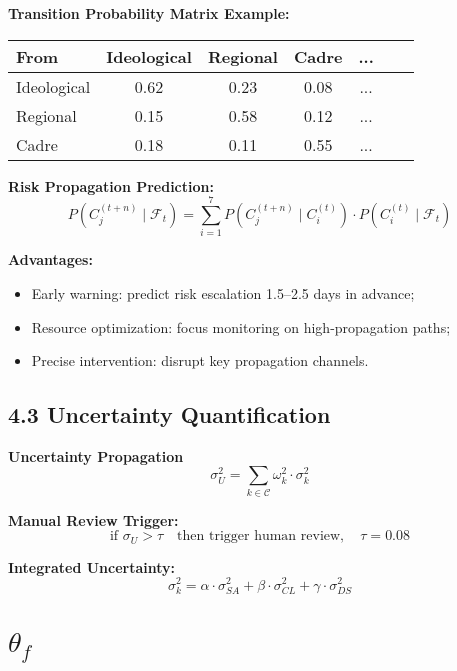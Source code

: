 \documentclass{article}
\numberwithin{equation}{section}
\begin{document}
\textbf{Transition Probability Matrix Example:}
\begin{table}[H]
\centering
\begin{tabular}{lcccccc}
\toprule
From & Ideological & Regional & Cadre & ... \\
\midrule
Ideological & 0.62 & 0.23 & 0.08 & ... \\
Regional & 0.15 & 0.58 & 0.12 & ... \\
Cadre & 0.18 & 0.11 & 0.55 & ... \\
\bottomrule
\end{tabular}
\end{table}

\textbf{Risk Propagation Prediction:}
$$
P(C_j^{(t+n)} \mid \mathcal{F}_t) = \sum_{i=1}^7 P(C_j^{(t+n)} \mid C_i^{(t)}) \cdot P(C_i^{(t)} \mid \mathcal{F}_t)
$$

\textbf{Advantages:}
\begin{itemize}
    \item Early warning: predict risk escalation 1.5–2.5 days in advance;
    \item Resource optimization: focus monitoring on high-propagation paths;
    \item Precise intervention: disrupt key propagation channels.
\end{itemize}

\subsection*{4.3 Uncertainty Quantification}

\textbf{Uncertainty Propagation}
$$
\sigma_U^2 = \sum_{k \in \mathcal{C}} \omega_k^2 \cdot \sigma_k^2
$$

\textbf{Manual Review Trigger:}
$$
\text{if } \sigma_U > \tau \quad \text{then trigger human review}, \quad \tau = 0.08
$$


\textbf{Integrated Uncertainty:}
$$
\sigma_k^2 = \alpha \cdot \sigma_{SA}^2 + \beta \cdot \sigma_{CL}^2 + \gamma \cdot \sigma_{DS}^2
$$

\section{$\theta_f$}
\end{document}
